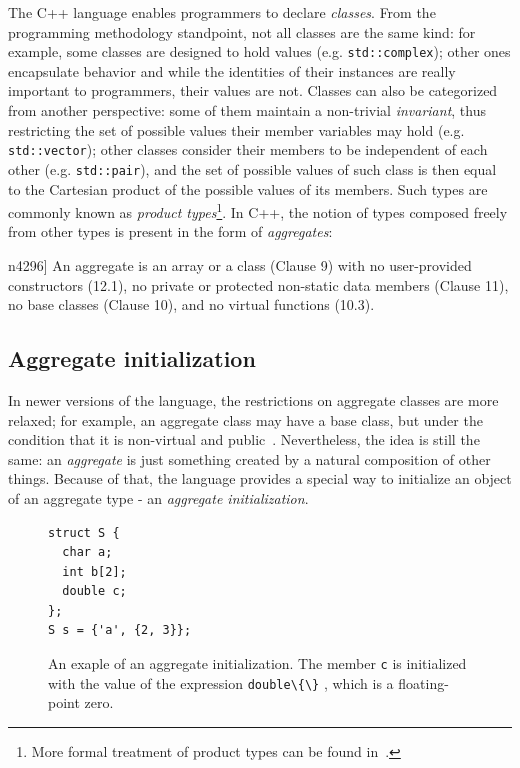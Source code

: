 \documentclass[nolot,nolof,nocover,printed]{fithesis3}
\newcommand{\stdN}[2]{\cite[#2]{#1}\xspace}
\begin{document}
The C++ language enables programmers to declare \textit{classes}. From the programming methodology standpoint, not all classes are the same kind: for example, some classes are designed to hold values (e.g. \texttt{std::complex}); other ones encapsulate behavior and while the identities of their instances are really important to programmers, their values are not. Classes can also be categorized from another perspective: some of them maintain a non-trivial \textit{invariant}, thus restricting the set of possible values their member variables may hold (e.g. \texttt{std::vector}); other classes consider their members to be independent of each other (e.g. \texttt{std::pair}), and the set of possible values of such class is then equal to the Cartesian product of the possible values of its members. Such types are commonly known as \textit{product types}\footnote{More formal treatment of product types can be found in~\cite[Chapter~1.5]{hottbook}.}. In C++, the notion of types composed freely from other types is present in the form of \textit{aggregates}:
\begin{displayquote}[\stdN{n4296}{\S 8.5.1/1}]
An aggregate is an array or a class (Clause 9) with no user-provided constructors (12.1), no private or
protected non-static data members (Clause 11), no base classes (Clause 10), and no virtual functions (10.3).
\end{displayquote}

\subsection{Aggregate initialization}
In newer versions of the language, the restrictions on aggregate classes are more relaxed; for example, an aggregate class may have a base class, but under the condition that it is non-virtual and public~\stdN{n4700}{\S 11.6.1/1}. Nevertheless, the idea is still the same: an \textit{aggregate} is just something created by a natural composition of other things. Because of that, the language provides a special way to initialize an object of an aggregate type - an \textit{aggregate initialization}.

\begin{figure}[ht]
\begin{lstlisting}
struct S {
  char a;
  int b[2];
  double c;
};
S s = {'a', {2, 3}};
\end{lstlisting}
\caption[Aggregate initialization.]{An exaple of an aggregate initialization. The member \texttt{c} is initialized with the value of the expression \lstinline|double\{\}| , which is a floating-point zero.}
\label{fig:aggrInit}
\end{figure}
\end{document}
